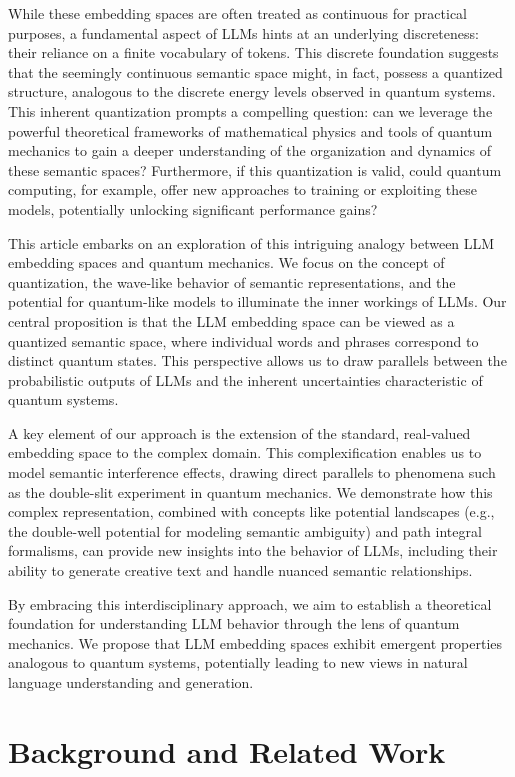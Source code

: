 \documentclass[prd,amsmath,amssymb,12pt]{revtex4}
\begin{document}
While these embedding spaces are often treated as continuous for practical purposes, a fundamental
aspect of LLMs hints at an underlying discreteness: their reliance on a finite vocabulary of tokens.
This discrete foundation suggests that the seemingly continuous semantic space might, in fact,
possess a quantized structure, analogous to the discrete energy levels observed in quantum systems.
This inherent quantization prompts a compelling question: can we leverage the powerful theoretical
frameworks of mathematical physics and tools of quantum mechanics to gain a deeper understanding of the organization
and dynamics of these semantic spaces?
Furthermore, if this quantization is valid, could quantum computing, for example, offer new approaches to training or
exploiting these models, potentially unlocking significant performance gains?

This article embarks on an exploration of this intriguing analogy between LLM embedding spaces and quantum mechanics.
We focus on the concept of quantization, the wave-like behavior of semantic representations, and the potential
for quantum-like models to illuminate the inner workings of LLMs. Our central proposition is that the LLM
embedding space can be viewed as a quantized semantic space, where individual words and phrases correspond to
distinct quantum states. This perspective allows us to draw parallels between the probabilistic outputs of
LLMs and the inherent uncertainties characteristic of quantum systems.

A key element of our approach is the extension of the standard, real-valued embedding space to the complex domain.
This complexification enables us to model semantic interference effects, drawing direct parallels to phenomena such
as the double-slit experiment in quantum mechanics. We demonstrate how this complex representation, combined with
concepts like potential landscapes (e.g., the double-well potential for modeling semantic ambiguity) and path
integral formalisms, can provide new insights into the behavior of LLMs, including their ability to generate
creative text and handle nuanced semantic relationships.

By embracing this interdisciplinary approach, we aim to establish a theoretical foundation for
understanding LLM behavior through the lens of quantum mechanics. We propose that LLM embedding
spaces exhibit emergent properties analogous to quantum systems,
potentially leading to new views in natural language understanding and generation.


\section{Background and Related Work}
\end{document}
